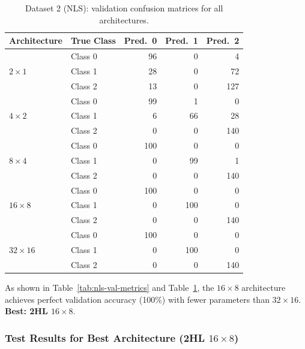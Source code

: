 \documentclass[11pt,a4paper]{article}
\begin{document}
\begin{table}[H]
\centering
\caption{Dataset 2 (NLS): validation confusion matrices for all architectures.}
\label{tab:nls-val-cm}
\small
\begin{tabular}{llrrr}
\toprule
Architecture & True Class & Pred.\ 0 & Pred.\ 1 & Pred.\ 2 \\
\midrule
\multirow{3}{*}{$2\times1$}   & Class 0 & 96  & 0   & 4   \\
                               & Class 1 & 28  & 0   & 72  \\
                               & Class 2 & 13  & 0   & 127 \\
\midrule
\multirow{3}{*}{$4\times2$}   & Class 0 & 99  & 1   & 0   \\
                               & Class 1 & 6   & 66  & 28  \\
                               & Class 2 & 0   & 0   & 140 \\
\midrule
\multirow{3}{*}{$8\times4$}   & Class 0 & 100 & 0   & 0   \\
                               & Class 1 & 0   & 99  & 1   \\
                               & Class 2 & 0   & 0   & 140 \\
\midrule
\multirow{3}{*}{$16\times8$}  & Class 0 & 100 & 0   & 0   \\
                               & Class 1 & 0   & 100 & 0   \\
                               & Class 2 & 0   & 0   & 140 \\
\midrule
\multirow{3}{*}{$32\times16$} & Class 0 & 100 & 0   & 0   \\
                               & Class 1 & 0   & 100 & 0   \\
                               & Class 2 & 0   & 0   & 140 \\
\bottomrule
\end{tabular}
\end{table}

As shown in Table~\ref{tab:nls-val-metrics} and Table~\ref{tab:nls-val-cm}, the $16\times8$ architecture achieves perfect validation accuracy (100\%) with fewer parameters than $32\times16$. \textbf{Best: 2HL $16\times8$}.

\subsubsection*{Test Results for Best Architecture (2HL $16\times8$)}
\end{document}

